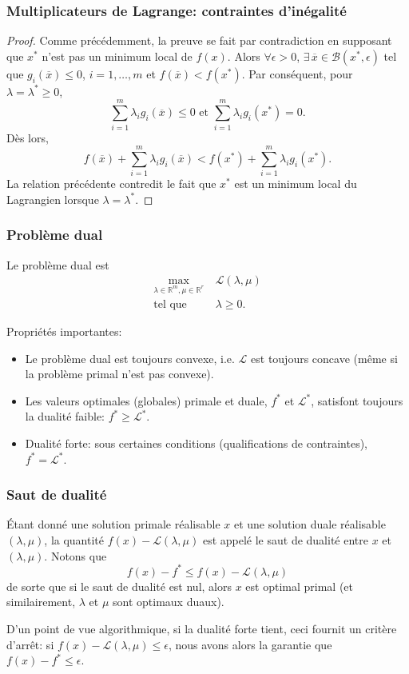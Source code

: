 \documentclass[usepdftitle=false]{beamer}
\def\blue{\color{blue}}
\def\cB{\mathcal{B}}
\def\cL{\mathcal{L}}
\def\RR{\mathbb{R}}
\begin{document}
\begin{frame}
\frametitle{Multiplicateurs de Lagrange: contraintes d'inégalité}
	
\begin{proof}
Comme précédemment, la preuve se fait par contradiction en supposant que $x^*$ n'est pas un minimum local de $f(x)$.
Alors $\forall \epsilon > 0$, $\exists\, \overline{x} \in \cB(x^*, \epsilon)$ tel que $g_i(\overline{x}) \leq 0$, $i = 1,\ldots,m$ et $f(\overline{x}) < f(x^*)$.
Par conséquent, pour $\lambda = \lambda^* \geq 0$,
$$
\sum_{i = 1}^{m} \lambda_i g_i(\overline{x}) \leq 0 \mbox{ et }
\sum_{i = 1}^{m} \lambda_i g_i(x^*) = 0.
$$
Dès lors,
$$
f(\overline{x}) + \sum_{i = 1}^{m} \lambda_i g_i(\overline{x}) < f(x^*) + \sum_{i = 1}^{m} \lambda_i g_i(x^*).
$$
La relation précédente contredit le fait que $x^*$ est un
minimum local du Lagrangien lorsque $\lambda = \lambda^*$.
\end{proof}

\end{frame}

\begin{frame}
\frametitle{Problème dual}

Le problème dual est
\begin{align*}
\max_{\lambda \in \RR^m, \mu \in \RR^r}\ & \cL(\lambda, \mu) \\
\mbox{tel que } & \lambda \geq 0.
\end{align*}

Propriétés importantes:
\begin{itemize}
\item
Le problème dual est toujours convexe, i.e. $\cL$ est toujours concave (même si la problème primal n'est pas convexe).
\item
Les valeurs optimales (globales) primale et duale, $f^*$ et $\cL^*$, satisfont toujours la dualité faible: $f^* \geq \cL^*$.
\item {\blue Dualité forte}: sous certaines conditions (qualifications de contraintes), $f^* = \cL^*$.
\end{itemize}

\end{frame}

\begin{frame}
\frametitle{Saut de dualité}

Étant donné une solution primale réalisable $x$ et une solution duale réalisable $(\lambda, \mu)$, la quantité $f(x) - \cL(\lambda, \mu)$ est appelé le saut de dualité entre $x$ et $(\lambda, \mu)$.
Notons que
$$
f(x) - f^* \leq f(x) - \cL(\lambda, \mu)
$$
de sorte que si le saut de dualité est nul, alors $x$ est optimal primal (et similairement, $\lambda$ et $\mu$ sont optimaux duaux).

\mbox{}

D'un point de vue algorithmique, si la dualité forte tient, ceci fournit un critère d'arrêt: si $f(x) - \cL(\lambda, \mu) \leq \epsilon$, nous avons alors la garantie que $f(x) - f^* \leq \epsilon$.

\end{frame}
\end{document}
